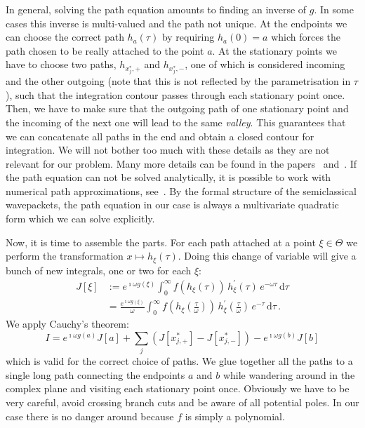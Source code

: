 \documentclass[a4paper,10pt]{article}
\begin{document}
In general, solving the path equation amounts to finding an inverse of $g$. In some cases
this inverse is multi-valued and the path not unique. At the endpoints we can
choose the correct path $h_a(\tau)$ by requiring $h_a(0) = a$ which forces the
path chosen to be really attached to the point $a$. At the stationary points we have
to choose two paths, $h_{x^{*}_j,+}$ and $h_{x^{*}_j,-}$, one of which is considered
incoming and the other outgoing (note that this is not reflected by the parametrisation
in $\tau$), such that the integration contour passes through each stationary point once.
Then, we have to make sure that the outgoing path of one stationary point
and the incoming of the next one will lead to the same \emph{valley}. This guarantees
that we can concatenate all paths in the end and obtain a closed contour for integration.
We will not bother too much with these details as they are not relevant for our problem.
Many more details can be found in the papers~\cite{HV_hoq} and~\cite{HV_cub}.
If the path equation can not be solved analytically, it is possible to work
with numerical path approximations, see~\cite{AH_nsd_pa}.
By the formal structure of the semiclassical wavepackets, the path equation in our case is always
a multivariate quadratic form which we can solve explicitly.

Now, it is time to assemble the parts. For each path attached at a point $\xi \in \Theta$
we perform the transformation $x \mapsto h_{\xi}(\tau)$. Doing this change of variable
will give a bunch of new integrals, one or two for each $\xi$:
\begin{equation}\label{eq:single_path_integral}
\begin{split}
  J[\xi] & := e^{\imath \omega g(\xi)}
              \int_{0}^{\infty}
                f(h_{\xi}(\tau)) \,
                h_{\xi}^{\prime}(\tau) \,
                e^{-\omega \tau} \,
              \mathrm{d}\tau \\
         & = \frac{e^{\imath \omega g(\xi)}}{\omega}
              \int_{0}^{\infty}
                f\left(h_{\xi}\left(\frac{\tau}{\omega}\right)\right) \,
                h_{\xi}^{\prime}\left(\frac{\tau}{\omega}\right) \,
                e^{-\tau} \,
              \mathrm{d}\tau \,.
\end{split}
\end{equation}
We apply Cauchy's theorem:
\begin{equation}\label{eq:cauchy}
      I = e^{\imath \omega g(a)} J[a]
        + \sum_{j} \left(J[x_{j,+}^{*}] - J[x_{j,-}^{*}]\right)
        - e^{\imath \omega g(b)} J[b]
\end{equation}
which is valid for the correct choice of paths. We glue together all the paths
to a single long path connecting the endpoints $a$ and $b$ while wandering around
in the complex plane and visiting each stationary point once. Obviously we have to
be very careful, avoid crossing branch cuts and be aware of all potential poles.
In our case there is no danger around because $f$ is simply a polynomial.
\end{document}
